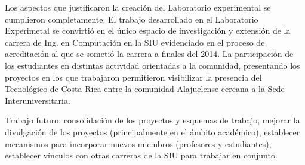 \documentclass[conference]{IEEEtran}
\begin{document}
Los aspectos que justificaron la creación del Laboratorio experimental se
cumplieron completamente. El trabajo desarrollado en el Laboratorio Experimetal
se convirtió en el único espacio de investigación y extensión de la carrera de
Ing. en Computación en la SIU evidenciado en el proceso de acreditación al que
se sometió la carrera a finales del 2014. La participación de los estudiantes en
distintas actividad orientadas a la comunidad, presentando los proyectos en los
que trabajaron permitieron visibilizar la presencia del Tecnológico de Costa
Rica entre la comunidad Alajuelense cercana a la Sede Interuniversitaria. 


Trabajo futuro: consolidación de los proyectos y esquemas de trabajo, mejorar la
divulgación de los proyectos (principalmente en el ámbito académico), establecer
mecanismos para incorporar nuevos miembros (profesores y estudiantes),
establecer vínculos con otras carreras de la SIU para trabajar en conjunto. 





%






\end{document}
